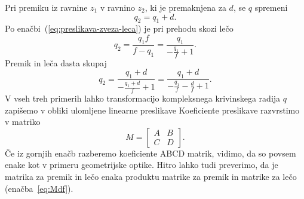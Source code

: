 Pri premiku iz ravnine $z_1$ v ravnino $z_2$, ki je premaknjena
za $d$, se $q$ spremeni 
\begin{equation}
q_2=q_1+d.
\end{equation}
Po enačbi~(\ref{eq:preslikava-zveza-leca}) je pri prehodu skozi lečo
\begin{equation}
q_2=\frac{q_1f}{f-q_1}=\frac{q_1}{-\frac{q_1}{f}+1}.
\end{equation}
Premik in leča dasta skupaj
\begin{equation}
q_2=\frac{q_1+d}{-\frac{q_1+d}{f}+1}=\frac{q_1+d}{-\frac{q_1}{f}-\frac{d}{f}+1}.
\end{equation}
V vseh treh primerih lahko transformacijo kompleksnega krivinskega radija 
$q$ zapišemo v obliki ulomljene
linearne preslikave 
Koeficiente preslikave razvrstimo v matriko 
\begin{equation}
M= \left[\begin{array}{cc}
A & B\\
C & D
\end{array}\right].
\end{equation}
Če iz gornjih enačb razberemo koeficiente ABCD matrik,
vidimo, da so povsem enake kot v primeru geometrijske optike. Hitro lahko tudi preverimo, 
da je matrika za premik in lečo enaka produktu matrike za premik in matrike za lečo
(enačba~\ref{eq:Mdf}). 

